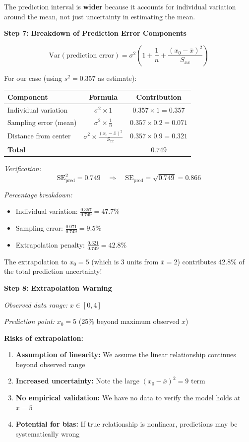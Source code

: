 \documentclass[12pt]{article}
\begin{document}
\begin{solution}
The prediction interval is \textbf{wider} because it accounts for individual variation around the mean, not just uncertainty in estimating the mean.

\textbf{Step 7: Breakdown of Prediction Error Components}

\[
\text{Var}(\text{prediction error}) = \sigma^2\left(1 + \frac{1}{n} + \frac{(x_0-\bar{x})^2}{S_{xx}}\right)
\]

For our case (using $s^2 = 0.357$ as estimate):

\begin{center}
\begin{tabular}{|l|c|c|}
\hline
\textbf{Component} & \textbf{Formula} & \textbf{Contribution} \\
\hline
Individual variation & $\sigma^2 \times 1$ & $0.357 \times 1 = 0.357$ \\
Sampling error (mean) & $\sigma^2 \times \frac{1}{n}$ & $0.357 \times 0.2 = 0.071$ \\
Distance from center & $\sigma^2 \times \frac{(x_0-\bar{x})^2}{S_{xx}}$ & $0.357 \times 0.9 = 0.321$ \\
\hline
\textbf{Total} & & $0.749$ \\
\hline
\end{tabular}
\end{center}

\textit{Verification:}
\[
\text{SE}_{\text{pred}}^2 = 0.749 \quad \Rightarrow \quad \text{SE}_{\text{pred}} = \sqrt{0.749} = 0.866
\]

\textit{Percentage breakdown:}
\begin{itemize}
    \item Individual variation: $\frac{0.357}{0.749} = 47.7\%$
    \item Sampling error: $\frac{0.071}{0.749} = 9.5\%$
    \item Extrapolation penalty: $\frac{0.321}{0.749} = 42.8\%$
\end{itemize}

The extrapolation to $x_0 = 5$ (which is 3 units from $\bar{x} = 2$) contributes 42.8\% of the total prediction uncertainty!

\textbf{Step 8: Extrapolation Warning}

\textit{Observed data range:} $x \in [0, 4]$

\textit{Prediction point:} $x_0 = 5$ (25\% beyond maximum observed $x$)

\textbf{Risks of extrapolation:}
\begin{enumerate}
    \item \textbf{Assumption of linearity:} We assume the linear relationship continues beyond observed range
    \item \textbf{Increased uncertainty:} Note the large $(x_0 - \bar{x})^2 = 9$ term
    \item \textbf{No empirical validation:} We have no data to verify the model holds at $x = 5$
    \item \textbf{Potential for bias:} If true relationship is nonlinear, predictions may be systematically wrong
\end{enumerate}


\end{solution}
\end{document}
